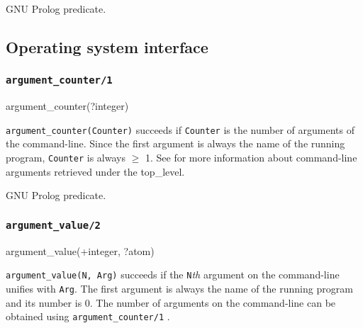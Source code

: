 \Portability

GNU Prolog predicate.

\subsection{Operating system interface}

\subsubsection{\texttt{argument\_counter/1}}
\label{argument-counter/1}

\begin{TemplatesOneCol}
argument\_counter(?integer)

\end{TemplatesOneCol}

\Description

\texttt{argument\_counter(Counter)} succeeds if \texttt{Counter} is the
number of arguments of the command-line. Since the first argument is always
the name of the running program, \texttt{Counter} is always $\geq$ 1. See
 for more information about
command-line arguments retrieved under the top\_level.


\begin{PlErrors}


\end{PlErrors}

\Portability

GNU Prolog predicate.

\subsubsection{\texttt{argument\_value/2}}
\label{argument-value/2}

\begin{TemplatesOneCol}
argument\_value(+integer, ?atom)

\end{TemplatesOneCol}

\Description

\texttt{argument\_value(N, Arg)} succeeds if the \texttt{N}\emph{th}
argument on the command-line unifies with \texttt{Arg}. The first argument
is always the name of the running program and its number is 0. The number of
arguments on the command-line can be obtained using
\texttt{argument\_counter/1} .

